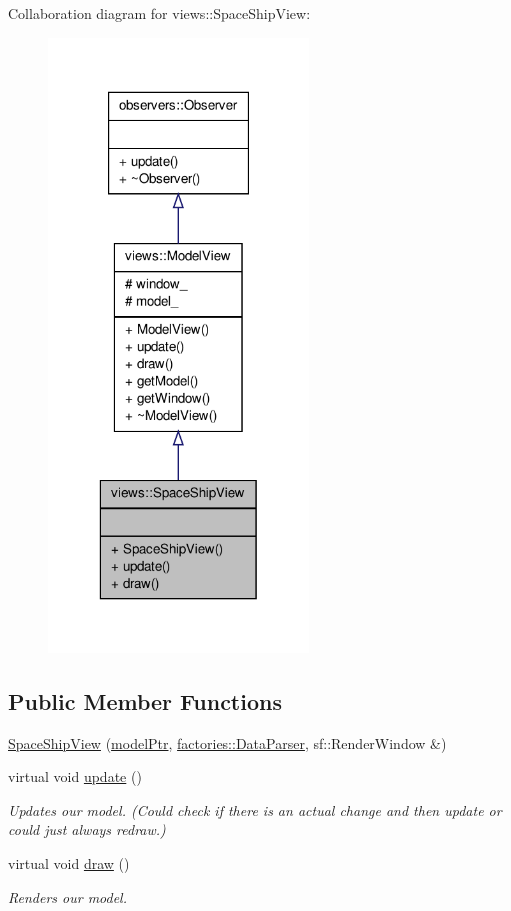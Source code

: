 \-Collaboration diagram for views\-:\-:\-Space\-Ship\-View\-:\nopagebreak
\begin{figure}[H]
\begin{center}
\leavevmode
\includegraphics[width=196pt]{d4/da3/classviews_1_1SpaceShipView__coll__graph}
\end{center}
\end{figure}
\subsection*{\-Public \-Member \-Functions}
\begin{DoxyCompactItemize}
\item 
\hyperlink{classviews_1_1SpaceShipView_a80d5148a9b4c304b68978578286352a4}{\-Space\-Ship\-View} (\hyperlink{ModelView_8h_a78966ddb517fca8d2b29a2bc5c31e74e}{model\-Ptr}, \hyperlink{classfactories_1_1DataParser}{factories\-::\-Data\-Parser}, sf\-::\-Render\-Window \&)
\item 
virtual void \hyperlink{classviews_1_1SpaceShipView_a25d82746241f5e18ad1b8041b30a9a88}{update} ()
\begin{DoxyCompactList}\small\item\em \-Updates our model. (\-Could check if there is an actual change and then update or could just always redraw.) \end{DoxyCompactList}\item 
virtual void \hyperlink{classviews_1_1SpaceShipView_a54809fd6b2877f3ea7d3d57db8155432}{draw} ()
\begin{DoxyCompactList}\small\item\em \-Renders our model. \end{DoxyCompactList}\end{DoxyCompactItemize}


